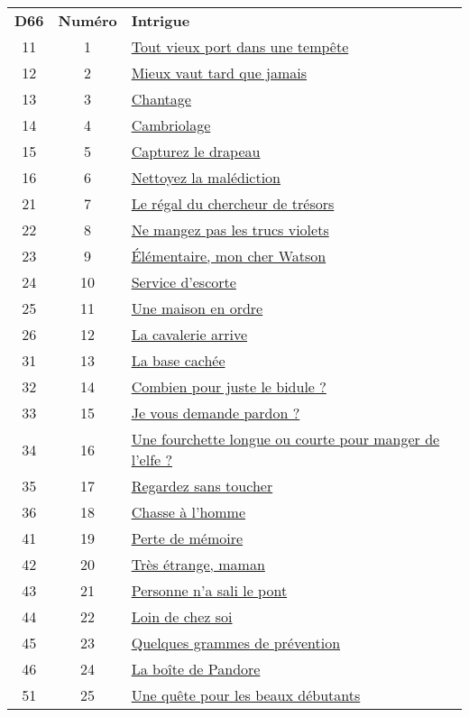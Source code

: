 \begin{center}
\begin{tabular}{ccl}
\textbf{D66} & \textbf{Numéro} & \textbf{Intrigue} \\
11 & 1 & \hyperref[port]{Tout vieux port dans une tempête} \\
12 & 2 & \hyperref[mieuxvaut]{Mieux vaut tard que jamais} \\
13 & 3 & \hyperref[chantage]{Chantage} \\
14 & 4 & \hyperref[cambriolage]{Cambriolage} \\
15 & 5 & \hyperref[drapeau]{Capturez le drapeau} \\
16 & 6 & \hyperref[malediction]{Nettoyez la malédiction} \\
21 & 7 & \hyperref[tresor]{Le régal du chercheur de trésors} \\
22 & 8 & \hyperref[violet]{Ne mangez pas les trucs violets} \\
23 & 9 & \hyperref[watson]{Élémentaire, mon cher Watson} \\
24 & 10 & \hyperref[escorte]{Service d’escorte} \\
25 & 11 & \hyperref[maison]{Une maison en ordre} \\
26 & 12 & \hyperref[cavalerie]{La cavalerie arrive} \\
31 & 13 & \hyperref[base]{La base cachée} \\
32 & 14 & \hyperref[bidule]{Combien pour juste le bidule ?} \\
33 & 15 & \hyperref[pardon]{Je vous demande pardon ?} \\
34 & 16 & \hyperref[elfe]{Une fourchette longue ou courte pour manger de l'elfe ?} \\
35 & 17 & \hyperref[regardez]{Regardez sans toucher} \\
36 & 18 & \hyperref[chasse]{Chasse à l'homme} \\
41 & 19 & \hyperref[memoire]{Perte de mémoire} \\
42 & 20 & \hyperref[etrange]{Très étrange, maman} \\
43 & 21 & \hyperref[pont]{Personne n'a sali le pont} \\
44 & 22 & \hyperref[loin]{Loin de chez soi} \\
45 & 23 & \hyperref[prevention]{Quelques grammes de prévention} \\
46 & 24 & \hyperref[pandore]{La boîte de Pandore} \\
51 & 25 & \hyperref[debutant]{Une quête pour les beaux débutants} \\

\end{tabular}
\end{center}
